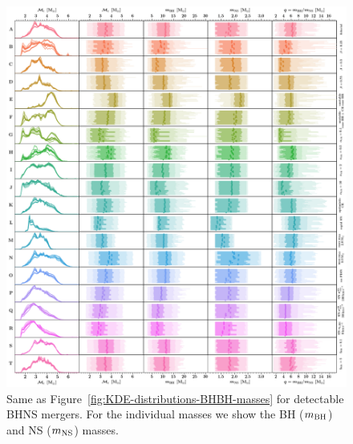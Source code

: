 \documentclass[fleqn,usenatbib]{mnras}
\begin{document}
%
\begin{figure}
    \centering
\includegraphics[width=1\textwidth]{figures/KDEplot_massesdet_BHNS.png} %
\caption{Same as Figure~\ref{fig:KDE-distributions-BHBH-masses} for detectable \ac{BHNS} mergers. For the individual masses we show the BH ($m_{\rm{BH}}$) and NS ($m_{\rm{NS}}$) masses.
\href{https://github.com/FloorBroekgaarden/Double-Compact-Object-Mergers/blob/main/plottingCode/Fig_4_and_Fig_5_and_Fig_6/KDEplot_massesdet_BHNS.png}{\faFileImage} \href{https://github.com/FloorBroekgaarden/Double-Compact-Object-Mergers/blob/main/plottingCode/Fig_4_and_Fig_5_and_Fig_6/make_figure_4_5_and_6-Only_Masses.ipynb}{\faBook} 
}
    \label{fig:KDE-distributions-BHNS-masses}
\end{figure}
%
\end{document}

